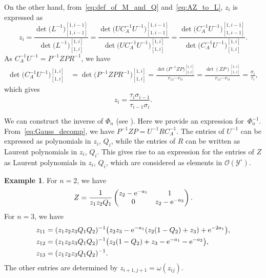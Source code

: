\documentclass[pdftex]{sigma}
\numberwithin{equation}{section}
\theoremstyle{definition}
\newtheorem{Example}[Theorem]{Example}
\begin{document}
On the other hand, from~\eqref{eq:def_of_M_and_Q} and~\eqref{eq:AZ_to_L}, $z_i$ is expressed as
\[
z_{i}
=\frac{\det\bigl(L^{-1}\bigr)^{[1,i-1]}_{[1,i-1]}}{\det\bigl(L^{-1}\bigr)^{[1,i]}_{[1,i]}}
=\frac{\det\bigl(UC_A^{-1}U^{-1}\bigr)^{[1,i-1]}_{[1,i-1]}}{\det\bigl(UC_A^{-1}U^{-1}\bigr)^{[1,i]}_{[1,i]}}
=
\frac{\det\bigl(C_A^{-1}U^{-1}\bigr)^{[1,i-1]}_{[1,i-1]}}{\det\bigl(C_A^{-1}U^{-1}\bigr)^{[1,i]}_{[1,i]}}.
\]
As $C_A^{-1}U^{-1}
=P^{-1}ZPR^{-1}$, we have
\begin{align*}
\det\bigl(C_A^{-1}U^{-1}\bigr)^{[1,i]}_{[1,i]}
&
=\det\bigl(P^{-1}ZPR^{-1}\bigr)^{[1,i]}_{[1,i]}
=\frac{\det\bigl(P^{-1}ZP\bigr)^{[1,i]}_{[1,i]}}{r_{11}\cdots r_{ii}}
=\frac{\det(ZP)^{[1,i]}_{[1,i]}}{r_{11}\cdots r_{ii}}
=\frac{\sigma_i}{\tau_i},
\end{align*}
which gives
\begin{equation}\label{eq:z_to_tau}
z_i
=\frac{\tau_i\sigma_{i-1}}{\tau_{i-1}\sigma_i}.
\end{equation}


We can construct the inverse of
$\Phi_n$ (see \cite[Section~3.4]{IIM}).
Here we provide an expression for~$\Phi_n^{-1}$.
From~\eqref{eq:Gauss_decomp}, we have
$
P^{-1}ZP=U^{-1}R C_A^{-1}$.
The entries of $U^{-1}$ can be expressed as
polynomials in $z_i$, $Q_i$, while the entries of $R$ can be written as Laurent polynomials in $z_i$, $Q_i$.
This gives rise to an expression
for the entries of $Z$ as Laurent polynomials in $z_i$, $Q_i$, which are considered as elements in $\mathscr{O}(\mathscr{Y}^\circ)$.
\begin{Example} For $n=2$, we have
\[%
Z=
\frac{1}{z_1z_2Q_1}
\begin{pmatrix}
z_2-{\rm e}^{-a_1}&1\\
0&z_2-{\rm e}^{-a_2}
\end{pmatrix}.
\]
For $n=3$, we have
\begin{align*}
&z_{11}=(z_1z_2z_3Q_1Q_2)^{-1}\bigl(z_2z_3-{\rm e}^{-a_1}(z_2(1-Q_2)+z_3)+{\rm e}^{-2a_1}\bigr),\\
&z_{12}=(z_1z_2z_3Q_1Q_2)^{-1}\bigl(z_2(1-Q_2)+z_3-{\rm e}^{-a_1}-{\rm e}^{-a_2}\bigr),\\
&z_{13}=(z_1z_2z_3Q_1Q_2)^{-1}.
\end{align*}
The other entries are determined by
$z_{i+1,j+1}=\omega(z_{ij})$.
\end{Example}
\end{document}
